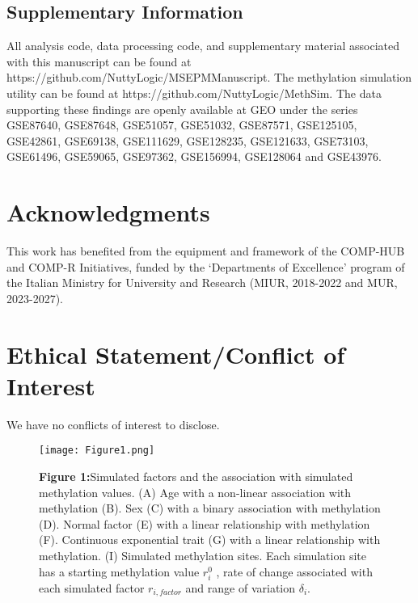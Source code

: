 \documentclass[sn-nature]{sn-jnl}
\begin{document}
{\begin{linenumbers}
\subsection{Supplementary Information}

All analysis code, data processing code, and supplementary material associated with this manuscript can be found at
 https://github.com/NuttyLogic/MSEPMManuscript. The methylation simulation utility can be found at 
 https://github.com/NuttyLogic/MethSim. The data supporting these findings are openly available at GEO 
 under the series GSE87640, GSE87648, GSE51057, GSE51032, GSE87571, GSE125105, GSE42861, GSE69138, GSE111629, 
 GSE128235, GSE121633, GSE73103, GSE61496, GSE59065, GSE97362, GSE156994, GSE128064 and GSE43976.


\section{Acknowledgments}
This work has benefited from the equipment and framework of the COMP-HUB and COMP-R Initiatives, funded by 
the ‘Departments of Excellence’ program of the Italian Ministry for University and Research (MIUR, 2018-2022 and MUR, 2023-2027).

\section{Ethical Statement/Conflict of Interest}
We have no conflicts of interest to disclose.

\end{linenumbers}




\newpage

\begin{center}
    \begin{figure}
    \texttt{[image: Figure1.png]}    
    \footnotesize
    \caption*{\small \textbf{Figure 1:}Simulated factors and the association with simulated methylation values. (A) Age with a non-linear association with methylation 
(B). Sex (C) with a binary association with methylation (D). Normal factor (E) with a linear relationship with methylation (F). Continuous exponential
 trait (G) with a linear relationship with methylation. (I) Simulated methylation sites. Each simulation site has a starting methylation value $r^0_i$ ,
  rate of change associated with each simulated factor $r_{i, factor}$ and range of variation $\delta_i$.}
    \end{figure}
\end{center}

}
\end{document}
